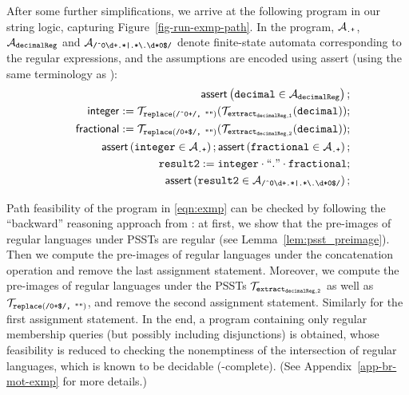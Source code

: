 After some further simplifications, we arrive at the following program
in our string logic, capturing Figure~\ref{fig-run-exmp-path}.  In
the program, $\mathcal{A}_{\scriptsize\mbox{\tt.+}}$, $\mathcal{A}_{\tt decimalReg}$
and
$\mathcal{A}_{\scriptsize\mbox{\tt /\^{}0\textbackslash
    d+.*|.*{\scriptsize\textbackslash}.\textbackslash d*0\$/}}$ denote
finite-state automata corresponding to the regular expressions, and
the assumptions are encoded using \textsf{assert} (using the same
terminology as \cite{CHL+19}):
\begin{eqnarray}\label{eqn:exmp}
& & \textsf{assert}\left(\tt decimal \in \mathcal{A}_{decimalReg}\right);\nonumber \\
& & \sf integer  := \tt  \mathcal{T}_{\tt replace(\mbox{\scriptsize \tt /\^{}0+/, ""})}(\mathcal{T}_{\tt extract_{decimalReg,1}}(decimal));\nonumber \\
& & \sf fractional  := \tt  \mathcal{T}_{\scriptsize\tt replace(\mbox{\tt /0+\$/, ""})}(\mathcal{T}_{\tt extract_{decimalReg,2}}(decimal)); \\
&&  \textsf{assert}\left(\tt integer \in \mathcal{A}_{\scriptsize\mbox{\tt.+}}\right); 
\textsf{assert}\left(\tt fractional \in \mathcal{A}_{\scriptsize\mbox{\tt.+}}\right); \nonumber\\
 && \tt result2 := integer \cdot ``." \cdot fractional; \nonumber\\
 && \textsf{assert}\left(\tt result2 \in \mathcal{A}_{\scriptsize\mbox{\tt /\^{}0\textbackslash d+.*|.*{\scriptsize\textbackslash}.\textbackslash d*0\$/}}\right); \nonumber
\end{eqnarray}

Path feasibility of the program in \eqref{eqn:exmp} can be checked by following the ``backward'' reasoning approach from \cite{CHL+19}: at first, we show that the pre-images of regular languages under PSSTs are regular (see Lemma~\ref{lem:psst_preimage}). Then we compute the pre-images of regular languages under the concatenation operation and remove the last assignment statement. Moreover, we compute the pre-images of regular languages under the PSSTs $\mathcal{T}_{\tt extract_{decimalReg,2}}$ as well as $\mathcal{T}_{\scriptsize\tt replace(\mbox{\tt /0+\$/, ""})}$, and remove the second assignment statement. Similarly for the first assignment statement. In the end, a program containing only regular membership queries (but possibly including disjunctions) is obtained, whose feasibility is reduced to checking the nonemptiness of the intersection of regular languages, which is known to be decidable (\pspace-complete). (See Appendix~\ref{app-br-mot-exmp} for more details.)